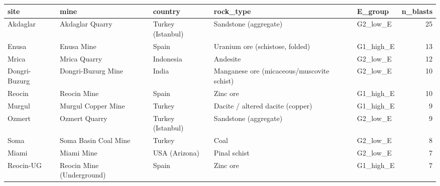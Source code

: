 \begin{tabular}{lllllr}
\toprule
site & mine & country & rock\_type & E\_group & n\_blasts \\
\midrule
Akdaglar & Akdaglar Quarry & Turkey (Istanbul) & Sandstone (aggregate) & G2\_low\_E & 25 \\
Enusa & Enusa Mine & Spain & Uranium ore (schistose, folded) & G1\_high\_E & 13 \\
Mrica & Mrica Quarry & Indonesia & Andesite & G2\_low\_E & 12 \\
Dongri-Buzurg & Dongri-Buzurg Mine & India & Manganese ore (micaceous/muscovite schist) & G2\_low\_E & 10 \\
Reocin & Reocin Mine & Spain & Zinc ore & G1\_high\_E & 10 \\
Murgul & Murgul Copper Mine & Turkey & Dacite / altered dacite (copper) & G1\_high\_E & 9 \\
Ozmert & Ozmert Quarry & Turkey (Istanbul) & Sandstone (aggregate) & G2\_low\_E & 9 \\
Soma & Soma Basin Coal Mine & Turkey & Coal & G2\_low\_E & 8 \\
Miami & Miami Mine & USA (Arizona) & Pinal schist & G2\_low\_E & 7 \\
Reocin-UG & Reocin Mine (Underground) & Spain & Zinc ore & G1\_high\_E & 7 \\
\bottomrule
\end{tabular}
